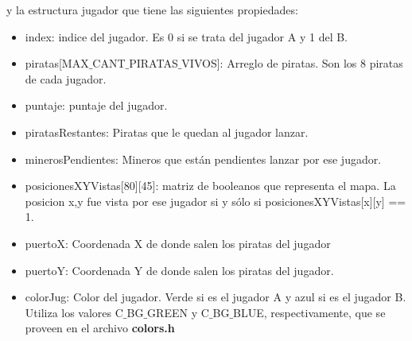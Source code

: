 y la estructura jugador que tiene las siguientes propiedades:
\begin{itemize}
\item index: indice del jugador. Es 0 si se trata del jugador A y 1 del B.
\item piratas[MAX$\_$CANT$\_$PIRATAS$\_$VIVOS]: Arreglo de piratas. Son los 8 piratas de cada jugador.
\item puntaje: puntaje del jugador.
\item piratasRestantes: Piratas que le quedan al jugador lanzar. 
\item minerosPendientes: Mineros que están pendientes lanzar por ese jugador. 
\item posicionesXYVistas[80][45]: matriz de booleanos que representa el mapa. La posicion x,y fue vista por ese jugador si y sólo si posicionesXYVistas[x][y] == 1.
\item puertoX: Coordenada X de donde salen los piratas del jugador
\item puertoY: Coordenada Y de donde salen los piratas del jugador. 
\item colorJug: Color del jugador. Verde si es el jugador A y azul si es el jugador B. Utiliza los valores C$\_$BG$\_$GREEN y C$\_$BG$\_$BLUE, respectivamente, que se proveen en el archivo \textbf{colors.h}
\end{itemize}